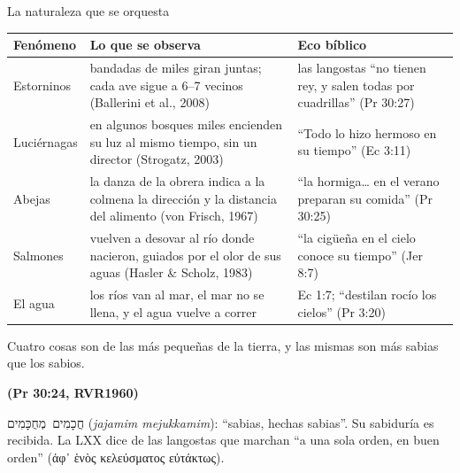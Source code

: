 \documentclass[hyperref={bookmarks=false},aspectratio=169]{beamer}
\newcommand{\heb}[1]{\mbox{\foreignlanguage{hebrew}{#1}}}
\newcommand{\grc}[1]{\foreignlanguage{ancientgreek}{#1}}
\newcommand{\fuente}[1]{\par\hfill{\upshape\bfseries\footnotesize\textcolor{azul}{#1}}}
\begin{document}
\begin{frame}{La naturaleza que se orquesta}
\fontsize{6.6}{7.8}\selectfont\renewcommand{\arraystretch}{1.12}
\begin{tabular}{@{}>{\RaggedRight\arraybackslash}p{2.0cm}>{\RaggedRight\arraybackslash}p{5.2cm}>{\RaggedRight\arraybackslash}p{4.5cm}@{}}
\toprule
\textbf{Fenómeno} & \textbf{Lo que se observa} & \textbf{Eco bíblico} \\ \midrule
Estorninos & bandadas de miles giran juntas; cada ave sigue a 6--7 vecinos (Ballerini et al., 2008) & las langostas ``no tienen rey, y salen todas por cuadrillas'' (Pr 30:27) \\
Luciérnagas & en algunos bosques miles encienden su luz al mismo tiempo, sin un director (Strogatz, 2003) & ``Todo lo hizo hermoso en su tiempo'' (Ec 3:11) \\
Abejas & la danza de la obrera indica a la colmena la dirección y la distancia del alimento (von Frisch, 1967) & ``la hormiga\ldots{} en el verano preparan su comida'' (Pr 30:25) \\
Salmones & vuelven a desovar al río donde nacieron, guiados por el olor de sus aguas (Hasler \& Scholz, 1983) & ``la cigüeña en el cielo conoce su tiempo'' (Jer 8:7) \\
El agua & los ríos van al mar, el mar no se llena, y el agua vuelve a correr & Ec 1:7; ``destilan rocío los cielos'' (Pr 3:20) \\
\bottomrule
\end{tabular}\par\smallskip
\begin{cita}[fontupper=\scriptsize\itshape,before skip=2pt,after skip=2pt]Cuatro cosas son de las más pequeñas de la tierra, y las mismas son más sabias que los sabios.\fuente{(Pr 30:24, RVR1960)}\end{cita}
\scriptsize\heb{חֲכָמִים מְחֻכָּמִים} (\emph{jajamim mejukkamim}): ``sabias, hechas sabias''. Su sabiduría es recibida. La LXX dice de las langostas que marchan ``a una sola orden, en buen orden'' (\grc{ἀφ᾽ ἑνὸς κελεύσματος εὐτάκτως}).
\end{frame}
\end{document}
